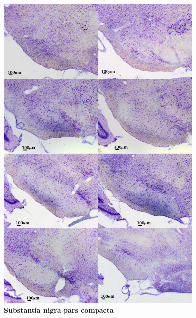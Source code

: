 \documentclass[12pt,a4paper,pdftex]{article}
\begin{document}
\begin{figure}[H]
    \centering
    \includegraphics[width = 0.9\textwidth]{pictures/immu/SNC.png}
    \caption[Substantia nigra pars compacta]{\textbf{Substantia nigra pars compacta}}
    \label{fig:SNC}
\end{figure}
\end{document}
